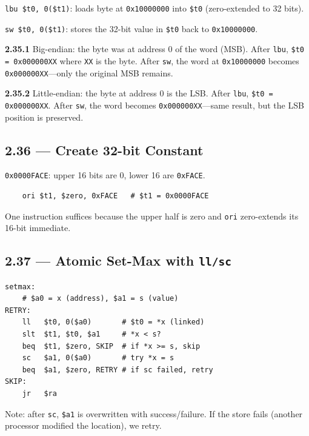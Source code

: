 \texttt{lbu \$t0, 0(\$t1)}: loads byte at \texttt{0x10000000} into
\texttt{\$t0} (zero-extended to 32 bits).

\texttt{sw \$t0, 0(\$t1)}: stores the 32-bit value in \texttt{\$t0} back
to \texttt{0x10000000}.

\noindent\textbf{2.35.1} Big-endian: the byte was at address 0 of the word
(MSB). After \texttt{lbu}, \texttt{\$t0 = 0x000000XX} where \texttt{XX} is
the byte. After \texttt{sw}, the word at \texttt{0x10000000} becomes
\texttt{0x000000XX}---only the original MSB remains.

\noindent\textbf{2.35.2} Little-endian: the byte at address 0 is the LSB.
After \texttt{lbu}, \texttt{\$t0 = 0x000000XX}. After \texttt{sw}, the word
becomes \texttt{0x000000XX}---same result, but the LSB position is preserved.

\subsection*{2.36 --- Create 32-bit Constant}
\hypertarget{sol-2.36}{}

\texttt{0x0000FACE}: upper 16 bits are 0, lower 16 are \texttt{0xFACE}.
\begin{verbatim}
    ori $t1, $zero, 0xFACE   # $t1 = 0x0000FACE
\end{verbatim}
One instruction suffices because the upper half is zero and \texttt{ori}
zero-extends its 16-bit immediate.

\subsection*{2.37 --- Atomic Set-Max with \texttt{ll/sc}}
\hypertarget{sol-2.37}{}

\begin{verbatim}
setmax:
    # $a0 = x (address), $a1 = s (value)
RETRY:
    ll   $t0, 0($a0)       # $t0 = *x (linked)
    slt  $t1, $t0, $a1     # *x < s?
    beq  $t1, $zero, SKIP  # if *x >= s, skip
    sc   $a1, 0($a0)       # try *x = s
    beq  $a1, $zero, RETRY # if sc failed, retry
SKIP:
    jr   $ra
\end{verbatim}

Note: after \texttt{sc}, \texttt{\$a1} is overwritten with success/failure.
If the store fails (another processor modified the location), we retry.

